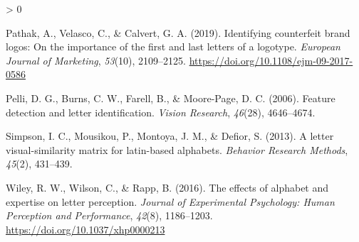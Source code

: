 \documentclass[
  english,
  man]{apa7}
\newlength{\cslhangindent}
\newenvironment{CSLReferences}[2] %
 {%
  \setlength{\parindent}{0pt}
  \ifodd #1 \everypar{\setlength{\hangindent}{\cslhangindent}}\ignorespaces\fi
  \ifnum #2 > 0
  \setlength{\parskip}{#2\baselineskip}
  \fi
 }%
 {}
\begin{document}
\begin{CSLReferences}{1}{0}
\leavevmode\hypertarget{ref-Pathak_2019}{}%
Pathak, A., Velasco, C., \& Calvert, G. A. (2019). Identifying counterfeit brand logos: On the importance of the first and last letters of a logotype. \emph{European Journal of Marketing}, \emph{53}(10), 2109--2125. \url{https://doi.org/10.1108/ejm-09-2017-0586}

\leavevmode\hypertarget{ref-pelli2006feature}{}%
Pelli, D. G., Burns, C. W., Farell, B., \& Moore-Page, D. C. (2006). Feature detection and letter identification. \emph{Vision Research}, \emph{46}(28), 4646--4674.

\leavevmode\hypertarget{ref-simpson2013letter}{}%
Simpson, I. C., Mousikou, P., Montoya, J. M., \& Defior, S. (2013). A letter visual-similarity matrix for latin-based alphabets. \emph{Behavior Research Methods}, \emph{45}(2), 431--439.

\leavevmode\hypertarget{ref-Wiley_2016}{}%
Wiley, R. W., Wilson, C., \& Rapp, B. (2016). The effects of alphabet and expertise on letter perception. \emph{Journal of Experimental Psychology: Human Perception and Performance}, \emph{42}(8), 1186--1203. \url{https://doi.org/10.1037/xhp0000213}

\end{CSLReferences}

\endgroup
\end{document}

